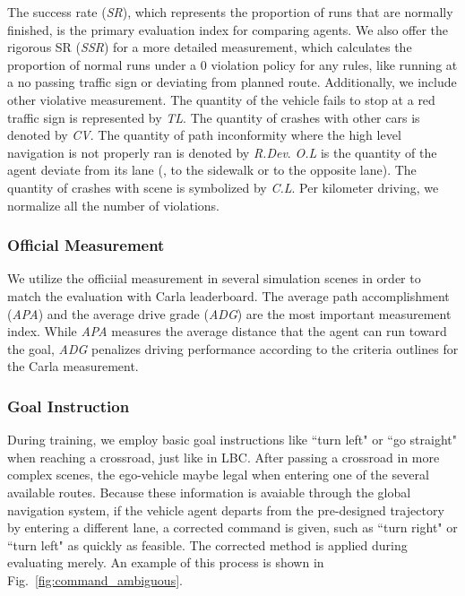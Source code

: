 The success rate (\emph{SR}), which represents the proportion of runs that are normally finished, is the primary evaluation index for comparing agents.
We also offer the rigorous SR (\emph{SSR}) for a more detailed measurement, which calculates the proportion of normal runs under a 0 violation policy for any rules, like running at a no passing traffic sign or deviating from planned route.
Additionally, we include other violative measurement.
The quantity of the vehicle fails to stop at a red traffic sign is represented by \emph{TL}.
The quantity of crashes with other cars is denoted by \emph{CV}.
The quantity of path inconformity where the high level navigation is not properly ran is denoted by \emph{R.Dev}.
\emph{O.L} is the quantity of the agent deviate from its lane ({\eg}, to the sidewalk or to the opposite lane).
The quantity of crashes with scene is symbolized by \emph{C.L}.
Per kilometer driving, we normalize all the number of violations.


\subsubsection{Official Measurement}\label{lb_metrics}
\hspace{1pc}We utilize the officiial measurement in several simulation scenes in order to match the evaluation with Carla leaderboard\cite{Hu:2022}.
The average path accomplishment (\emph{APA}) and the average drive grade (\emph{ADG}) are the most important measurement index. 
While \emph{APA} measures the average distance that the agent can run toward the goal,
\emph{ADG} penalizes driving performance according to the criteria outlines for the Carla measurement.



\subsubsection{Goal Instruction} 
\hspace{1pc}During training, we employ basic goal instructions like ``turn left" or ``go straight" when reaching a crossroad, just like in LBC\cite{Codevilla:2019}.
After passing a crossroad in more complex scenes, the ego-vehicle maybe legal when entering one of the several available routes. 
Because these information is avaiable through the global navigation system, if the vehicle agent departs from the pre-designed trajectory by entering a different lane, a corrected command is given, such as ``turn right" or ``turn left" as quickly as feasible. 
The corrected method is applied during evaluating merely.
An example of this process is shown in Fig.~\ref{fig:command_ambiguous}.



